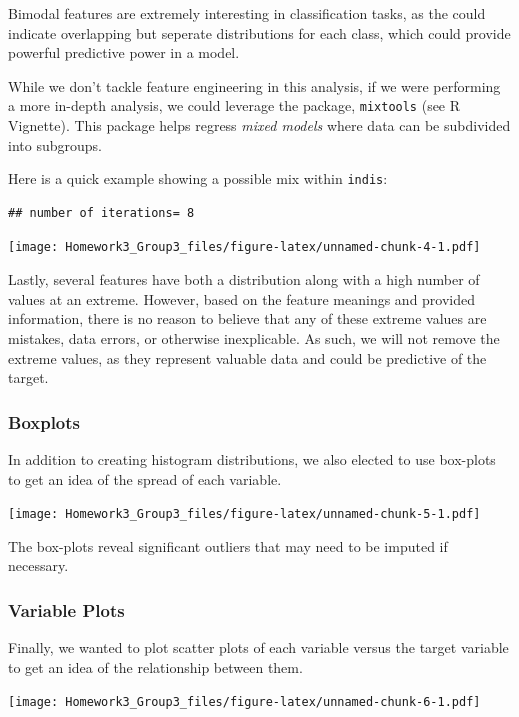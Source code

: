\documentclass[
]{article}
\begin{document}
Bimodal features are extremely interesting in classification tasks, as
the could indicate overlapping but seperate distributions for each
class, which could provide powerful predictive power in a model.

While we don't tackle feature engineering in this analysis, if we were
performing a more in-depth analysis, we could leverage the package,
\texttt{mixtools} (see R Vignette). This package helps regress
\emph{mixed models} where data can be subdivided into subgroups.

Here is a quick example showing a possible mix within \texttt{indis}:

\begin{verbatim}
## number of iterations= 8
\end{verbatim}

\texttt{[image: Homework3\_Group3\_files/figure-latex/unnamed-chunk-4-1.pdf]}

Lastly, several features have both a distribution along with a high
number of values at an extreme. However, based on the feature meanings
and provided information, there is no reason to believe that any of
these extreme values are mistakes, data errors, or otherwise
inexplicable. As such, we will not remove the extreme values, as they
represent valuable data and could be predictive of the target.

\hypertarget{boxplots}{%
\subsubsection{Boxplots}\label{boxplots}}

In addition to creating histogram distributions, we also elected to use
box-plots to get an idea of the spread of each variable.

\texttt{[image: Homework3\_Group3\_files/figure-latex/unnamed-chunk-5-1.pdf]}

The box-plots reveal significant outliers that may need to be imputed if
necessary.

\hypertarget{variable-plots}{%
\subsubsection{Variable Plots}\label{variable-plots}}

Finally, we wanted to plot scatter plots of each variable versus the
target variable to get an idea of the relationship between them.

\texttt{[image: Homework3\_Group3\_files/figure-latex/unnamed-chunk-6-1.pdf]}
\end{document}
